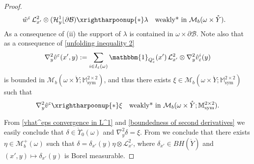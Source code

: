 \documentclass[reqno,10pt]{amsart}
\numberwithin{equation}{section}
\theoremstyle{remark}
\newcommand{\calB}{\mathcal{B}}
\newcommand{\calH}{\mathcal{H}}
\newcommand{\calL}{\mathcal{L}}
\newcommand{\M}{\mathbb{M}}
\newcommand{\calM}{\mathcal{M}}
\DeclareMathOperator{\sym}{sym}
\newcommand{\weakstar}{\xrightharpoonup{*}}
\newcommand{\eps}{\varepsilon}
\newcommand{\Mb}{\mathcal{M}_b}
\newcommand{\mres}[1]{\lfloor{#1}}
\newcommand{\charfun}[1]{\mathbbm{1}_{#1}}
\newcommand{\calZzero}[1]{\mathring{\Upsilon}_0({#1})}
\newcommand{\D}{\nabla}
\begin{document}
\begin{proof}
\begin{align}
	\label{what^eps convergence in L^1} \hat{w}^\eps \,\calL_{x'}^2 \otimes (\calH^{1}_{y}\mres\partial\calB ) & \weakstar \lambda \quad \text{weakly* in $\Mb(\omega \times \mathring{Y})$}.
\end{align}
As a consequence of  (ii) the support of $\lambda$ is contained in $\omega \times \partial \calB$.
Note also that as a consequence of \eqref{unfolding inequality 2} 
\[
	{\D}^2_y\hat{v}^\eps(x',y) := \sum_{i \in I_\eps(\omega)} \charfun{Q_\eps^i}(x')\,\calL_{x'}^2 \otimes {\D}^2_y\hat{v}_\eps^i(y)
\]
is bounded in $\calM_b (\omega \times \mathring{Y};\M^{2 \times 2}_{\sym})$, and thus there exists $\xi \in \calM_b (\omega \times \mathring{Y};\M^{2 \times 2}_{\sym})$ such that 
\begin{equation} \label{boundedness of second derivatives} 
	{\D}^2_y \hat{v}^\eps \weakstar \xi \quad \text{weakly* in } \Mb(\omega \times \mathring{Y};\M^{2 \times 2}_{\sym}). 
\end{equation} 

From \eqref{vhat^eps convergence in L^1} and \eqref{boundedness of second derivatives} we easily conclude that $\delta \in \calZzero{\omega}$ and ${\D}^2_y \delta=\xi$. 
From  we conclude that there exists $\eta \in \calM_b^+(\omega)$ such that $\delta=\delta_{x'}(y) \eta \otimes \calL_{x'}^2$, where $\delta_{x'} \in BH(\mathring{Y})$ and $(x',y)\mapsto \delta_{x'}(y)$ is Borel measurable. 



\end{proof}
\end{document}
